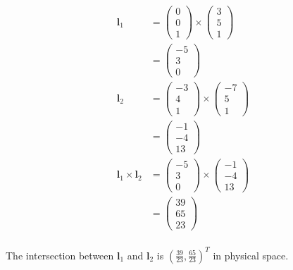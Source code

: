 \documentclass[11pt]{article}
\begin{document}
\begin{enumerate}
\begin{align*}
\mathbf{l}_1 &= 
	\begin{pmatrix}
		0 \\ 0 \\ 1
	\end{pmatrix} 
	\times
	\begin{pmatrix}
		3 \\ 5 \\ 1
	\end{pmatrix}\\
&= 
	\begin{pmatrix}
		-5 \\ 3 \\ 0
	\end{pmatrix}\\
\mathbf{l}_2 &= 
	\begin{pmatrix}
		-3 \\ 4 \\ 1
	\end{pmatrix} 
	\times
	\begin{pmatrix}
		-7 \\ 5 \\ 1
	\end{pmatrix}\\
&= 
	\begin{pmatrix}
		-1 \\ -4 \\ 13
	\end{pmatrix}\\
\mathbf{l}_1 \times  \mathbf{l}_2&= 
	\begin{pmatrix}
		-5 \\ 3 \\ 0
	\end{pmatrix} 
	\times
	\begin{pmatrix}
		-1 \\ -4 \\ 13
	\end{pmatrix}\\
&= 
	\begin{pmatrix}
		39 \\ 65 \\ 23
	\end{pmatrix}\\
\end{align*}

The intersection between $\mathbf{l}_1$ and $\mathbf{l}_2$ is $(\frac{39}{23},\frac{65}{23})^T$ in physical space.


\end{enumerate}
\end{document}
